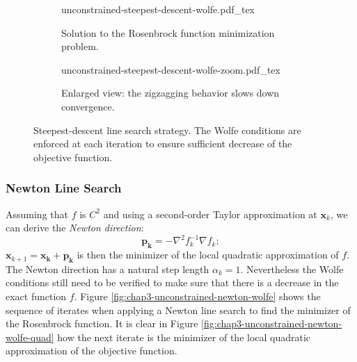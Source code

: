 \begin{figure}
  \setlength{\belowcaptionskip}{\baselineskip}
  \centering
  \begin{subfigure}{0.8\columnwidth}
    \centering
        {\def\svgwidth{\linewidth}
          {\footnotesize
            
                       {unconstrained-steepest-descent-wolfe.pdf_tex}
          }
        }
        \caption{Solution to the Rosenbrock function minimization
          problem.}
        \label{fig:chap3-unconstrained-steepest-descent-wolfe-a}
  \end{subfigure}
  \begin{subfigure}{0.8\columnwidth}
    \centering
        {\def\svgwidth{\linewidth}
          {\footnotesize
            
                       {unconstrained-steepest-descent-wolfe-zoom.pdf_tex}
          }
        }
        \caption{Enlarged view: the zigzagging behavior slows down
          convergence.}
        \label{fig:chap3-unconstrained-steepest-descent-wolfe-b}
  \end{subfigure}
  \caption{Steepest-descent line search strategy. The Wolfe conditions
    are enforced at each iteration to ensure sufficient decrease of
    the objective function.}
  \label{fig:chap3-unconstrained-steepest-descent-wolfe}
\end{figure}

\subsubsection{Newton Line Search}

Assuming that $f$ is $C^2$ and using a second-order Taylor
approximation at $\mathbf{x}_k$, we can derive the \emph{Newton
  direction}:
\begin{equation}
\mathbf{p_k} = -\nabla^2 f_k^{-1} \nabla f_k;
\end{equation}
$\mathbf{x}_{k+1}=\mathbf{x_k}+\mathbf{p_k}$ is then the minimizer of
the local quadratic approximation of $f$. The Newton direction has a
natural step length $\alpha_k=1$. Nevertheless the Wolfe conditions
still need to be verified to make sure that there is a decrease in the
exact function $f$. Figure \ref{fig:chap3-unconstrained-newton-wolfe}
shows the sequence of iterates when applying a Newton line search to
find the minimizer of the Rosenbrock function. It is clear in Figure
\ref{fig:chap3-unconstrained-newton-wolfe-quad} how the next iterate
is the minimizer of the local quadratic approximation of the objective
function.

